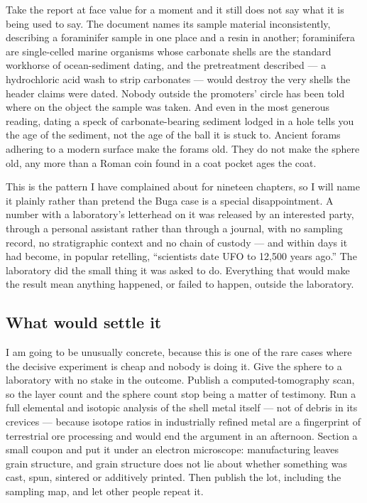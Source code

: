 Take the report at face value for a moment and it still does not say what it is being used to say.
The document names its sample material inconsistently, describing a foraminifer sample in one place
and a resin in another; foraminifera are single-celled marine organisms whose carbonate shells are the
standard workhorse of ocean-sediment dating, and the pretreatment described --- a hydrochloric acid
wash to strip carbonates --- would destroy the very shells the header claims were dated. Nobody
outside the promoters' circle has been told where on the object the sample was taken. And even in the
most generous reading, dating a speck of carbonate-bearing sediment lodged in a hole tells you the age
of the sediment, not the age of the ball it is stuck to. Ancient forams adhering to a modern surface
make the forams old. They do not make the sphere old, any more than a Roman coin found in a coat
pocket ages the coat.

This is the pattern I have complained about for nineteen chapters, so I will name it plainly rather
than pretend the Buga case is a special disappointment. A number with a laboratory's letterhead on it
was released by an interested party, through a personal assistant rather than through a journal, with
no sampling record, no stratigraphic context and no chain of custody --- and within days it had become,
in popular retelling, ``scientists date UFO to 12,500 years ago.'' The laboratory did the small thing
it was asked to do. Everything that would make the result mean anything happened, or failed to happen,
outside the laboratory.

\subsection{What would settle it}

I am going to be unusually concrete, because this is one of the rare cases where the decisive
experiment is cheap and nobody is doing it. Give the sphere to a laboratory with no stake in the
outcome. Publish a computed-tomography scan, so the layer count and the sphere count stop being a
matter of testimony. Run a full elemental and isotopic analysis of the shell metal itself --- not of
debris in its crevices --- because isotope ratios in industrially refined metal are a fingerprint of
terrestrial ore processing and would end the argument in an afternoon. Section a small coupon and put
it under an electron microscope: manufacturing leaves grain structure, and grain structure does not
lie about whether something was cast, spun, sintered or additively printed. Then publish the lot,
including the sampling map, and let other people repeat it.

